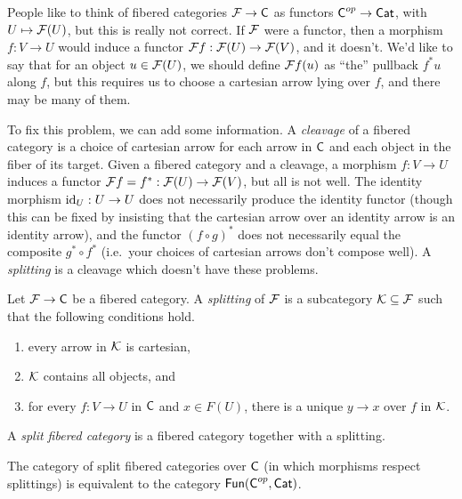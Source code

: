 
 People like to think of fibered categories $\mathcal{F}\to \text{\sf C}$ as functors $\text{\sf C}^{op}\to \text{\sf Cat}$,
 with $U\mapsto \mathcal{F}(U)$, but this is really not correct. If $\mathcal{F}$ were a functor, then a
 morphism $f:V\to U$ would induce a functor $\mathcal{F} f:\mathcal{F}(U)\to \mathcal{F}(V)$, and it doesn't. We'd
 like to say that for an object $u\in \mathcal{F}(U)$, we should define $\mathcal{F} f(u)$ as ``the''
 pullback $f^*u$ along $f$, but this requires us to choose a cartesian arrow lying over
 $f$, and there may be many of them.

 To fix this problem, we can add some information. A \emph{cleavage} of a fibered
 category is a choice of cartesian arrow for each arrow in $\text{\sf C}$ and each object in the
 fiber of its target. Given a fibered category and a cleavage, a morphism $f:V\to U$
 induces a functor $\mathcal{F} f=f^*:\mathcal{F}(U)\to \mathcal{F}(V)$, but all is not well. The identity
 morphism $\operatorname{id}_U:U\to U$ does not necessarily produce the identity functor (though this
 can be fixed by insisting that the cartesian arrow over an identity arrow is an identity
 arrow), and the functor $(f\circ g)^*$ does not necessarily equal the composite $g^*
 \circ f^*$ (i.e.~your choices of cartesian arrows don't compose well). A
 \emph{splitting} is a cleavage which doesn't have these problems.
 \begin{definition}
   Let $\mathcal{F}\to \text{\sf C}$ be a fibered category. A \emph{splitting} of $\mathcal{F}$ is a subcategory
   $\mathcal{K}\subseteq \mathcal{F}$ such that the following conditions hold.
   \begin{enumerate}
     \item every arrow in $\mathcal{K}$ is cartesian,
     \item $\mathcal{K}$ contains all objects, and
     \item for every $f:V\to U$ in $\text{\sf C}$ and $x\in F(U)$, there is a unique $y\to x$ over
     $f$ in $\mathcal{K}$.
   \end{enumerate}
   A \emph{split fibered category} is a fibered category together with a splitting.
 \end{definition}
 \begin{lemma} \label{lec23L:split<=>functor}
   The category of split fibered categories over $\text{\sf C}$ (in which morphisms respect
   splittings) is equivalent to the category $\operatorname{\sf Fun}(\text{\sf C}^{op},\text{\sf Cat})$.
 \end{lemma}
